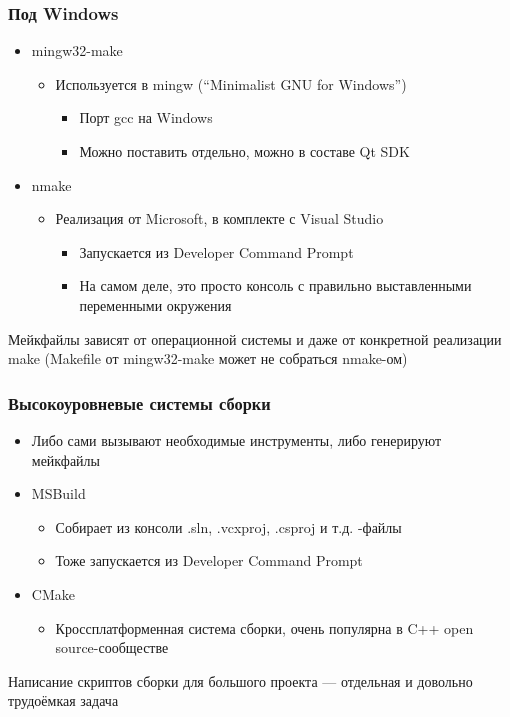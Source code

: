 \documentclass[xetex,mathserif,serif]{beamer}
\begin{document}
    \begin{frame}
        \frametitle{Под Windows}
        \begin{itemize}
            \item mingw32-make
            \begin{itemize}
                \item Используется в mingw (``Minimalist GNU for Windows'')
                \begin{itemize}
                    \item Порт gcc на Windows
                    \item Можно поставить отдельно, можно в составе Qt SDK
                \end{itemize}
            \end{itemize}
            \item nmake
            \begin{itemize}
                \item Реализация от Microsoft, в комплекте с Visual Studio
                \begin{itemize}
                    \item Запускается из Developer Command Prompt
                    \item На самом деле, это просто консоль с правильно выставленными переменными окружения
                \end{itemize}
            \end{itemize}
        \end{itemize}
        Мейкфайлы зависят от операционной системы и даже от конкретной реализации make (Makefile от mingw32-make может не собраться nmake-ом)
    \end{frame}

    \begin{frame}
        \frametitle{Высокоуровневые системы сборки}
        \begin{itemize}
            \item Либо сами вызывают необходимые инструменты, либо генерируют мейкфайлы
            \item MSBuild
            \begin{itemize}
                \item Собирает из консоли .sln, .vcxproj, .csproj и т.д. -файлы
                \item Тоже запускается из Developer Command Prompt
            \end{itemize}
            \item CMake
            \begin{itemize}
                \item Кроссплатформенная система сборки, очень популярна в C++ open source-сообществе
            \end{itemize}
        \end{itemize}
        Написание скриптов сборки для большого проекта --- отдельная и довольно трудоёмкая задача
    \end{frame}
\end{document}
